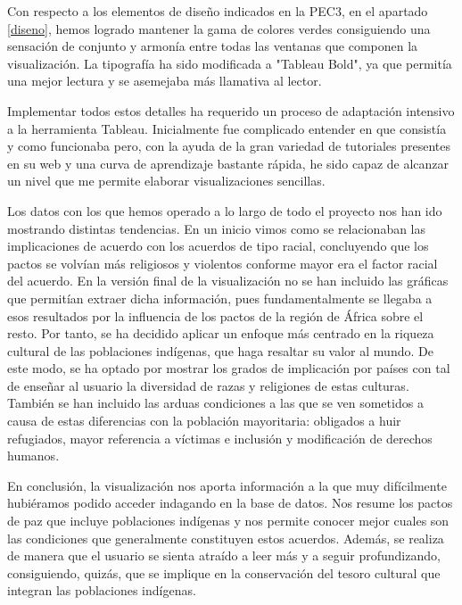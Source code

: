\documentclass[11pt]{article}
\begin{document}
Con respecto a los elementos de diseño indicados en la PEC3, en el apartado \ref{diseno}, hemos logrado mantener la gama de colores verdes consiguiendo una sensación de conjunto y armonía entre todas las ventanas que componen la visualización.  La tipografía ha sido modificada a "Tableau Bold", ya que permitía una mejor lectura y se asemejaba más llamativa al lector.

Implementar todos estos detalles ha requerido un proceso de adaptación intensivo a la herramienta Tableau. Inicialmente fue complicado entender en que consistía y como funcionaba pero, con la ayuda de la gran variedad de tutoriales presentes en su web y una curva de aprendizaje bastante rápida, he sido capaz de alcanzar un nivel que me permite elaborar visualizaciones sencillas. 

Los datos con los que hemos operado a lo largo de todo el proyecto nos han ido mostrando distintas tendencias. En un inicio vimos como se relacionaban las implicaciones de acuerdo con los acuerdos de tipo racial, concluyendo que los pactos se volvían más religiosos y violentos conforme mayor era el factor racial del acuerdo. En la versión final de la visualización no se han incluido las gráficas que permitían extraer dicha información, pues fundamentalmente se llegaba a esos resultados por la influencia de los pactos de la región de África sobre el resto. Por tanto, se ha decidido aplicar un enfoque más centrado en la riqueza cultural de las poblaciones indígenas, que haga resaltar su valor al mundo. De este modo, se ha optado por mostrar los grados de implicación por países con tal de enseñar al usuario la diversidad de razas y religiones de estas culturas. También se han incluido las arduas condiciones a las que se ven sometidos a causa de estas diferencias con la población mayoritaria: obligados a huir refugiados, mayor referencia a víctimas e inclusión y modificación de derechos humanos.

En conclusión, la visualización nos aporta información a la que muy difícilmente hubiéramos podido acceder indagando en la base de datos. Nos resume los pactos de paz que incluye poblaciones indígenas y nos permite conocer mejor cuales son las condiciones que generalmente constituyen estos acuerdos. Además, se realiza de manera que el usuario se sienta atraído a leer más y a seguir profundizando, consiguiendo, quizás, que se implique en la conservación del tesoro cultural que integran las poblaciones indígenas.



\pagebreak
\end{document}
